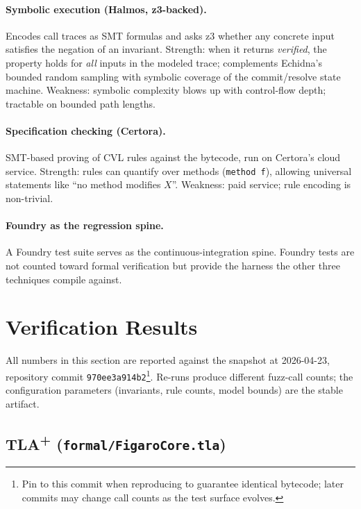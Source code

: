 \documentclass[11pt,a4paper]{article}
\theoremstyle{definition}
\theoremstyle{remark}
\begin{document}
\paragraph{Symbolic execution (Halmos, z3-backed).}
Encodes call traces as SMT formulas and asks z3 whether any concrete
input satisfies the negation of an invariant. Strength: when it
returns \emph{verified}, the property holds for \emph{all} inputs in
the modeled trace; complements Echidna's bounded random sampling
with symbolic coverage of the commit/resolve state machine.
Weakness: symbolic complexity blows up with control-flow depth;
tractable on bounded path lengths.

\paragraph{Specification checking (Certora).}
SMT-based proving of CVL rules against the bytecode, run on
Certora's cloud service. Strength: rules can quantify over methods
(\texttt{method f}), allowing universal statements like ``no method
modifies $X$''. Weakness: paid service; rule encoding is non-trivial.

\paragraph{Foundry as the regression spine.}
A Foundry test suite serves as the continuous-integration spine.
Foundry tests are not counted toward formal verification but
provide the harness the other three techniques compile against.

\section{Verification Results}
\label{sec:verification-results}

All numbers in this section are reported against the snapshot at
2026-04-23, repository commit
\texttt{970ee3a914b2}\footnote{Pin to this commit when reproducing
to guarantee identical bytecode; later commits may change call
counts as the test surface evolves.}. Re-runs produce different
fuzz-call counts; the configuration parameters (invariants, rule
counts, model bounds) are the stable artifact.

\subsection{TLA\textsuperscript{+} (\texttt{formal/FigaroCore.tla})}
\end{document}
